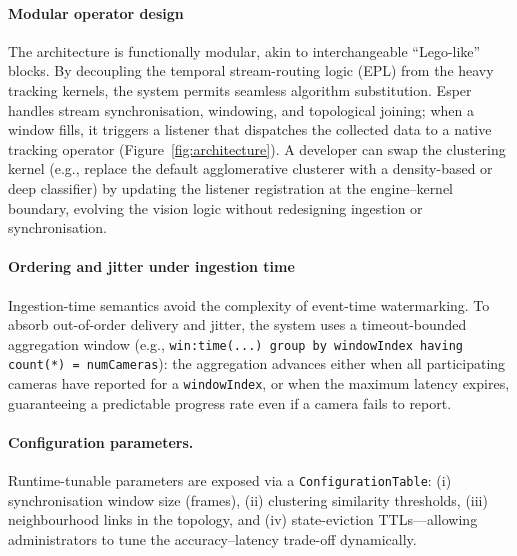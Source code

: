 \documentclass[review]{elsarticle}
\begin{document}
\paragraph{Modular operator design}
The architecture is functionally modular, akin to interchangeable ``Lego-like'' blocks. By decoupling the temporal stream-routing logic (EPL) from the heavy tracking kernels, the system permits seamless algorithm substitution. Esper handles stream synchronisation, windowing, and topological joining; when a window fills, it triggers a listener that dispatches the collected data to a native tracking operator (Figure~\ref{fig:architecture}). A developer can swap the clustering kernel (e.g., replace the default agglomerative clusterer with a density-based or deep classifier) by updating the listener registration at the engine--kernel boundary, evolving the vision logic without redesigning ingestion or synchronisation.

\paragraph{Ordering and jitter under ingestion time}
Ingestion-time semantics avoid the complexity of event-time watermarking. To absorb out-of-order delivery and jitter, the system uses a timeout-bounded aggregation window (e.g., \texttt{win:time(...) group by windowIndex having count(*) = numCameras}): the aggregation advances either when all participating cameras have reported for a \texttt{windowIndex}, or when the maximum latency expires, guaranteeing a predictable progress rate even if a camera fails to report.

\paragraph{Configuration parameters.}
Runtime-tunable parameters are exposed via a \texttt{ConfigurationTable}: (i) synchronisation window size (frames), (ii) clustering similarity thresholds, (iii) neighbourhood links in the topology, and (iv) state-eviction TTLs---allowing administrators to tune the accuracy--latency trade-off dynamically.
\end{document}
